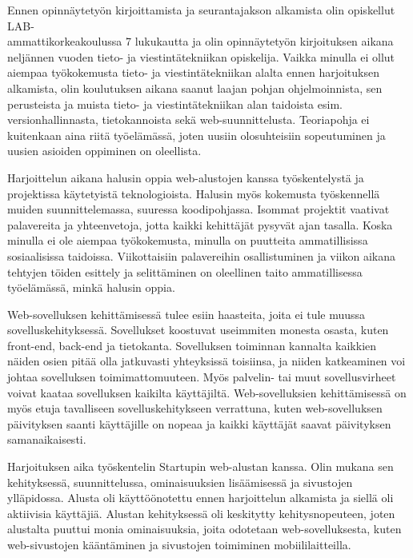 \documentclass[11pt,a4paper,titlepage,oneside]{article}
\begin{document}
Ennen opinnäytetyön kirjoittamista ja seurantajakson alkamista olin opiskellut LAB-\\ammattikorkeakoulussa 7 lukukautta ja
olin opinnäytetyön kirjoituksen aikana neljännen vuoden tieto- ja viestintätekniikan opiskelija.
Vaikka minulla ei ollut aiempaa työkokemusta tieto- ja viestintätekniikan alalta ennen harjoituksen alkamista,
olin koulutuksen aikana saanut laajan pohjan ohjelmoinnista,
sen perusteista ja muista tieto- ja viestintätekniikan alan taidoista esim. versionhallinnasta, tietokannoista sekä web-suunnittelusta.
Teoriapohja ei kuitenkaan aina riitä työelämässä, joten uusiin olosuhteisiin sopeutuminen ja uusien asioiden oppiminen on oleellista.
\medskip




Harjoittelun aikana halusin oppia web-alustojen kanssa työskentelystä ja projektissa käytetyistä teknologioista.
Halusin myös kokemusta työskennellä muiden suunnittelemassa, suuressa koodipohjassa.
Isommat projektit vaativat palavereita ja yhteenvetoja, jotta kaikki kehittäjät pysyvät ajan tasalla.
Koska minulla ei ole aiempaa työkokemusta, minulla on puutteita ammatillisissa sosiaalisissa taidoissa.
%
Viikottaisiin palavereihin osallistuminen ja viikon aikana tehtyjen töiden esittely 
ja selittäminen on oleellinen taito ammatillisessa työelämässä, minkä halusin oppia.
\medskip


Web-sovelluksen kehittämisessä tulee esiin haasteita, joita ei tule muussa sovelluskehityksessä.
Sovellukset koostuvat useimmiten monesta osasta, kuten front-end, back-end ja tietokanta.
% 
Sovelluksen toiminnan kannalta kaikkien näiden osien pitää olla jatkuvasti yhteyksissä toisiinsa, ja niiden katkeaminen 
voi johtaa sovelluksen toimimattomuuteen.
Myös palvelin- tai muut sovellusvirheet voivat kaataa sovelluksen kaikilta käyttäjiltä. 
Web-sovelluksien kehittämisessä on myös etuja tavalliseen sovelluskehitykseen verrattuna, kuten 
web-sovelluksen päivityksen saanti käyttäjille on nopeaa ja kaikki käyttäjät saavat päivityksen samanaikaisesti.
\medskip

Harjoituksen aika työskentelin Startupin web-alustan kanssa. 
Olin mukana sen kehityksessä, suunnittelussa, ominaisuuksien lisäämisessä ja sivustojen ylläpidossa.
Alusta oli käyttöönotettu ennen harjoittelun alkamista ja siellä oli aktiivisia käyttäjiä.
Alustan kehityksessä oli keskitytty kehitysnopeuteen,
joten alustalta puuttui monia ominaisuuksia, joita odotetaan web-sovelluksesta, 
kuten web-sivustojen kääntäminen ja sivustojen toimiminen mobiililaitteilla.
\medskip
\end{document}
